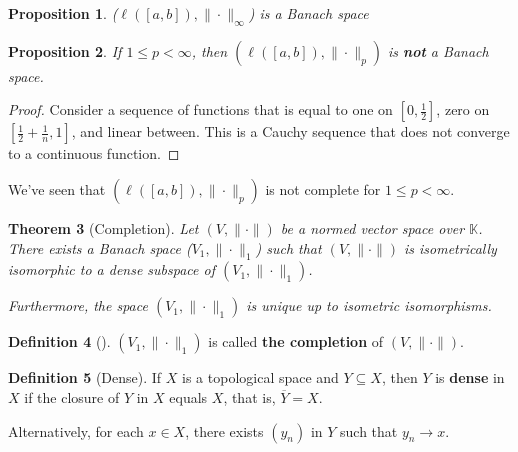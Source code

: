 \documentclass[justified]{tufte-book}
\theoremstyle{plain}%
\newtheorem{thm}{Theorem}[chapter]
\newtheorem{prop}[thm]{Proposition}
\theoremstyle{definition}
\newtheorem{defn}[thm]{Definition}
\theoremstyle{remark}
\newcommand{\K}{\mathbb{K}}
\begin{document}
\begin{prop}
  ($\ell([a,b]), \|\cdot \|_\infty$) is a Banach space
\end{prop}

\begin{prop}
  If $1 \leq p < \infty$, then $(\ell([a,b]), \| \cdot \|_p)$ is \textbf{not} a Banach space.
\end{prop}
\begin{proof}
  Consider a sequence of functions that is equal to one on $[0, \frac{1}{2}]$, zero on $[\frac{1}{2}+ \frac{1}{n}, 1]$, and linear between.  This is a Cauchy sequence that does not converge to a continuous function. 
\end{proof}

We've seen that $(\ell([a,b]), \| \cdot \|_p)$ is not complete for $1 \leq p < \infty$.  

\begin{thm}[Completion] Let $(V, \| \cdot \| )$ be a normed vector space over $\K$.  There exists a Banach space ($V_1, \| \cdot \|_1$) such that $( V, \| \cdot \|)$ is isometrically isomorphic to a dense subspace of $(V_1, \| \cdot \|_1)$.  
  
  Furthermore, the space $( V_1, \| \cdot \|_1)$ is unique up to isometric isomorphisms.
\end{thm}


\begin{defn}[] $(V_1, \| \cdot \|_1)$ is called \textbf{the completion} of $(V, \| \cdot \|)$. 
\end{defn}

\begin{defn}[Dense]
  If $X$ is a topological space and $Y \subseteq X$, then $Y$ is \textbf{dense} in $X$ if the closure of $Y$ in $X$ equals $X$, that is, $\overline{Y} = X$.

Alternatively, for each $x \in X$, there exists $(y_n)$ in $Y$ such that $y_n \rightarrow x$.
\end{defn}
\end{document}
